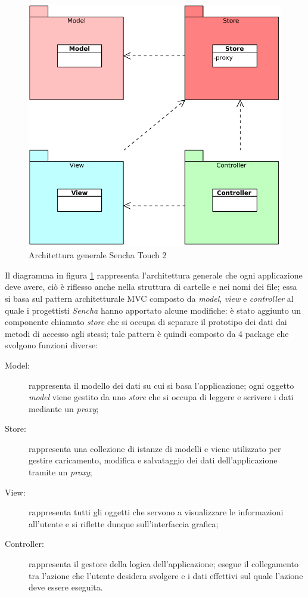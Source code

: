 \begin{figure}[htb]
\centering
\includegraphics[scale=0.6]{gfx/class/Sencha_Touch_2.pdf}
\caption{Architettura generale Sencha Touch 2}
\label{fig:architettura Sencha}
\end{figure}
Il diagramma in figura \ref{fig:architettura Sencha} rappresenta l'architettura generale che ogni applicazione deve avere, ciò è riflesso anche nella struttura di cartelle e nei nomi dei file; essa si basa sul pattern architetturale \ac{MVC} composto da \emph{model}, \emph{view} e \emph{controller} al quale i progettisti \emph{Sencha} hanno apportato alcune modifiche: è stato aggiunto un componente chiamato \emph{store} che si occupa di separare il prototipo dei dati dai metodi di accesso agli stessi; tale pattern è quindi composto da 4 package che svolgono funzioni diverse:
\begin{description}
\item[Model:] rappresenta il modello dei dati su cui si basa l'applicazione; ogni oggetto \emph{model} viene gestito da uno \emph{store} che si occupa di leggere e scrivere i dati mediante un \emph{proxy};
\item[Store:] rappresenta una collezione di istanze di modelli e viene utilizzato per gestire caricamento, modifica e salvataggio dei dati dell'applicazione tramite un \emph{proxy};
\item[View:] rappresenta tutti gli oggetti che servono a visualizzare le informazioni all'utente e si riflette dunque sull'interfaccia grafica;
\item[Controller:] rappresenta il gestore della logica dell'applicazione; esegue il collegamento tra l'azione che l'utente desidera svolgere e i dati effettivi sul quale l'azione deve essere eseguita.
\end{description}

